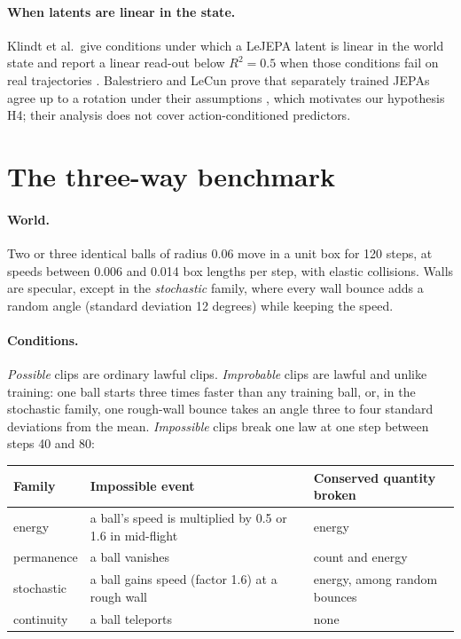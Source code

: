 \documentclass[11pt]{article}
\begin{document}
\paragraph{When latents are linear in the state.} Klindt et al.\ give conditions under which a
LeJEPA latent is linear in the world state and report a linear read-out below $R^2 = 0.5$ when those
conditions fail on real trajectories \citep{klindt2026lejepa}. Balestriero and LeCun prove that
separately trained JEPAs agree up to a rotation under their assumptions
\citep{balestriero2026platonic}, which motivates our hypothesis H4; their analysis does not cover
action-conditioned predictors.

\section{The three-way benchmark}\label{sec:benchmark}

\paragraph{World.} Two or three identical balls of radius 0.06 move in a unit box for 120 steps, at
speeds between 0.006 and 0.014 box lengths per step, with elastic collisions. Walls are specular,
except in the \emph{stochastic} family, where every wall bounce adds a random angle (standard
deviation 12 degrees) while keeping the speed.

\paragraph{Conditions.} \emph{Possible} clips are ordinary lawful clips. \emph{Improbable} clips are
lawful and unlike training: one ball starts three times faster than any training ball, or, in the
stochastic family, one rough-wall bounce takes an angle three to four standard deviations from the
mean. \emph{Impossible} clips break one law at one step between steps 40 and 80:

\begin{center}\small
\begin{tabular}{lll}\toprule
Family & Impossible event & Conserved quantity broken\\\midrule
energy & a ball's speed is multiplied by 0.5 or 1.6 in mid-flight & energy\\
permanence & a ball vanishes & count and energy\\
stochastic & a ball gains speed (factor 1.6) at a rough wall & energy, among random bounces\\
continuity & a ball teleports & none\\\bottomrule
\end{tabular}
\end{center}
\end{document}
